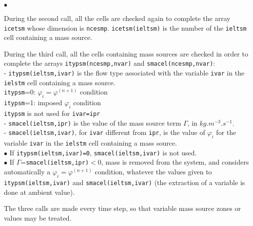 {{{\begin{list}{$\bullet$}{}
\item During the second call, all the cells are checked again to
      complete the array \texttt{icetsm} whose dimension is
      \texttt{ncesmp}. \mbox{\texttt{icetsm(ieltsm)}} is the number of the
      \texttt{ieltsm}\raisebox{1ex}{\small th} cell containing a mass source.

\item During the third call, all the cells containing mass sources are
      checked in order to complete the arrays
      \mbox{\texttt{itypsm(ncesmp,nvar)}} and
      \mbox{\texttt{smacel(ncesmp,nvar)}}:\\
- \texttt{itypsm(ieltsm,ivar)} is the flow type associated with the variable
      \texttt{ivar} in the \texttt{ielstm}\raisebox{1ex}{\small th} cell
      containing a mass source.\\
\hspace*{1cm}\texttt{itypsm}=0: $\varphi_i=\varphi^{(n+1)}$ condition\\
\hspace*{1cm}\texttt{itypsm}=1: imposed $\varphi_i$ condition\\
\hspace*{1cm}\texttt{itypsm} is not used for \texttt{ivar=ipr}\\
- \texttt{smacel(ieltsm,ipr)} is the value of the mass source term $\Gamma$, in
$kg.m^{-3}.s^{-1}$.\\
- \texttt{smacel(ieltsm,ivar)}, for \texttt{ivar} different from
\texttt{ipr}, is the value
of $\varphi_i$ for the variable \texttt{ivar} in the
\texttt{ielstm}\raisebox{1ex}{\small th} cell containing a mass source.\\

$\bullet$ If \texttt{itypsm(ieltsm,ivar)=0}, \texttt{smacel(ieltsm,ivar)}
      is not used.\\
$\bullet$ If $\Gamma$=\texttt{smacel(ieltsm,ipr)}$<$0, mass is removed from
      the system, and \CS considers automatically a
      $\varphi_i=\varphi^{(n+1)}$ condition, whatever the values given
      to \texttt{itypsm(ieltsm,ivar)} and \texttt{smacel(ieltsm,ivar)}
      (the extraction of a variable is done at ambient value).
\end{list}



The three calls are made every time step, so that variable mass source
zones or values may be treated.\\

}}}
